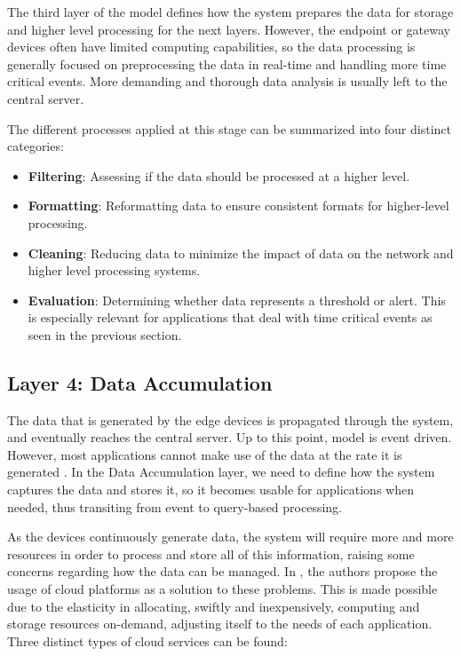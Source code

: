 The third layer of the model defines how the system prepares the data for storage and higher level processing for the next layers. However, the endpoint or gateway devices often have limited computing capabilities, so the data processing is generally focused on preprocessing the data in real-time and handling more time critical events. More demanding and thorough data analysis is usually left to the central server. \bigskip

The different processes applied at this stage can be summarized into four distinct categories:

\begin{itemize}
    \item \textbf{Filtering}: Assessing if the data should be processed at a higher level. 
    \item \textbf{Formatting}: Reformatting data to ensure consistent formats for higher-level processing.
    \item \textbf{Cleaning}: Reducing data to minimize the impact of data on the network and higher level processing systems.
    \item \textbf{Evaluation}: Determining whether data represents a threshold or alert. This is especially relevant for applications that deal with time critical events as seen in the previous section.
\end{itemize}


\subsection{Layer 4: Data Accumulation}
\label{sec:iot-model-layer4}

The data that is generated by the edge devices is propagated through the system, and eventually reaches the central server. Up to this point, model is event driven. However, most applications cannot make use of the data at the rate it is generated \cite{10.5555/3161403}. In the Data Accumulation layer, we need to define how the system captures the data and stores it, so it becomes usable for applications when needed, thus transiting from event to query-based processing. \bigskip

As the devices continuously generate data, the system will require more and more resources in order to process and store all of this information, raising some concerns regarding how the data can be managed. In \cite{Doukas2012}, the authors propose the usage of cloud platforms as a solution to these problems. This is made possible due to the elasticity in allocating, swiftly and inexpensively, computing and storage resources on-demand, adjusting itself to the needs of each application. Three distinct types of cloud services can be found: %

